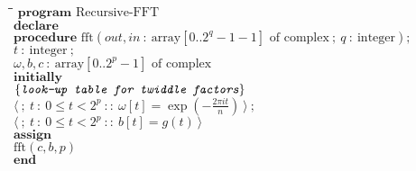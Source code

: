 \begin{tabbing}
	\quad\=\quad\=\quad\=\kill
	$\mathbf{program} \textrm{ Recursive-FFT}$\\
	$\mathbf{declare}$\\
		\>$\mathbf{procedure} \textrm{ fft}(\mathit{out},\mathit{in}\ :\ \mathrm{array}[0..2^{q}-1-1] \textrm{ of complex}\ ;\ q\ :\ \mathrm{integer});$ \\
		\>$t\ :\ \textrm{integer}\ ;$\\
		\>$\omega,b,c\ :\ \mathrm{array}[0..2^{p}-1] \textrm{ of complex}$\\
	$\mathbf{initially}$\\
		\>$\color{MidnightBlue}\curlb{\textit{\ttfamily look-up table for twiddle factors}}$\\
		\>$\langle \ ;\ t\ :\ 0\leq t<2^p\ ::\ \omega[t] = \exp(-\frac{2\pi it}{n})\ \rangle\ ;$\\
		\>$\langle \ ;\ t\ :\ 0\leq t<2^p\ ::\ b[t] = g(t)\ \rangle$\\
	$\mathbf{assign}$\\
		\>$\mathrm{fft}(c,b,p)$\\
	$\mathbf{end}$\\
\end{tabbing}